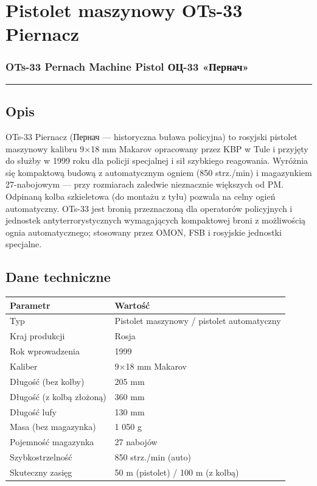 \documentclass[12pt,openany,oneside]{book}
\begin{document}
\chapter{Pistolet maszynowy OTs-33
Piernacz}\label{pistolet-maszynowy-ots-33-piernacz}

\subsection{OTs-33 Pernach Machine Pistol \textbar{} ОЦ-33
«Пернач»}\label{ots-33-pernach-machine-pistol-ux43eux446-33-ux43fux435ux440ux43dux430ux447}

\begin{center}\rule{0.5\linewidth}{0.5pt}\end{center}

\section{Opis}\label{opis-94}

OTs-33 Piernacz (Пернач --- historyczna buława policyjna) to rosyjski
pistolet maszynowy kalibru 9×18 mm Makarov opracowany przez KBP w Tule i
przyjęty do służby w 1999 roku dla policji specjalnej i sił szybkiego
reagowania. Wyróżnia się kompaktową budową z automatycznym ogniem (850
strz./min) i magazynkiem 27-nabojowym --- przy rozmiarach zaledwie
nieznacznie większych od PM. Odpinaną kolba szkieletowa (do montażu z
tyłu) pozwala na celny ogień automatyczny. OTs-33 jest bronią
przeznaczoną dla operatorów policyjnych i jednostek antyterrorystycznych
wymagających kompaktowej broni z możliwością ognia automatycznego;
stosowany przez OMON, FSB i rosyjskie jednostki specjalne.

\section{Dane techniczne}\label{dane-techniczne-94}

\begin{longtable}[]{@{}ll@{}}
\toprule\noalign{}
Parametr & Wartość \\
\midrule\noalign{}
\endhead
\bottomrule\noalign{}
\endlastfoot
Typ & Pistolet maszynowy / pistolet automatyczny \\
Kraj produkcji & Rosja \\
Rok wprowadzenia & 1999 \\
Kaliber & 9×18 mm Makarov \\
Długość (bez kolby) & 205 mm \\
Długość (z kolbą złożoną) & 360 mm \\
Długość lufy & 130 mm \\
Masa (bez magazynka) & 1 050 g \\
Pojemność magazynka & 27 nabojów \\
Szybkostrzelność & 850 strz./min (auto) \\
Skuteczny zasięg & 50 m (pistolet) / 100 m (z kolbą) \\
\end{longtable}
\end{document}
